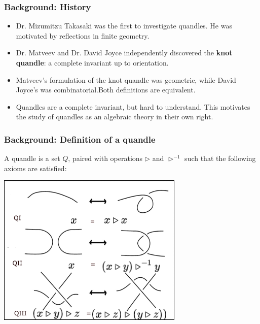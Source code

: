 \documentclass[10pt]{beamer}
\newcommand{\thru}{\rhd} %
\newcommand{\bthru}{\inv{\thru}} %
\newcommand{\inv}[1]{#1^{-1}}
\theoremstyle{plain}
\begin{document}
    \begin{frame}
        \frametitle{Background: History}
    \begin{itemize}
        \item Dr. Mizumitzu Takasaki was the first to investigate quandles. He was motivated by reflections in finite geometry. 

        \pause 

        \item Dr. Matveev and Dr. David Joyce independently discovered the \textbf{knot quandle}: a complete invariant up to orientation.

        \pause

    \item Matveev's formulation of the knot quandle was geometric, while David Joyce's was combinatorial.Both definitions are equivalent.

        \pause

    \item Quandles are a complete invariant, but hard to understand. This motivates the study of quandles as an algebraic theory in their own right. \cite{birrell2007knot}
    \end{itemize}
    \end{frame}

    \begin{frame}
        \frametitle{Background: Definition of a quandle}

        \begin{definition} \cite{birrell2007knot} \cite{joyce1982classifying}
            A quandle is a set $Q$, paired with operations $\thru$ and $\bthru$ such that the following axioms are satisfied:
        \end{definition}
        \includegraphics[scale = 0.75]{figures/reidemeisterMoves.png}
    \end{frame}
\end{document}
